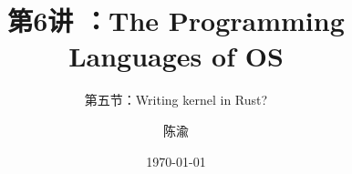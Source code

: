 


\title[第6讲]{第6讲 ：The Programming Languages of OS} %
\subtitle{第五节：Writing kernel in Rust?}
\author{陈渝} %
\date{\today} %




\begin{frame}
\titlepage %
\end{frame}

